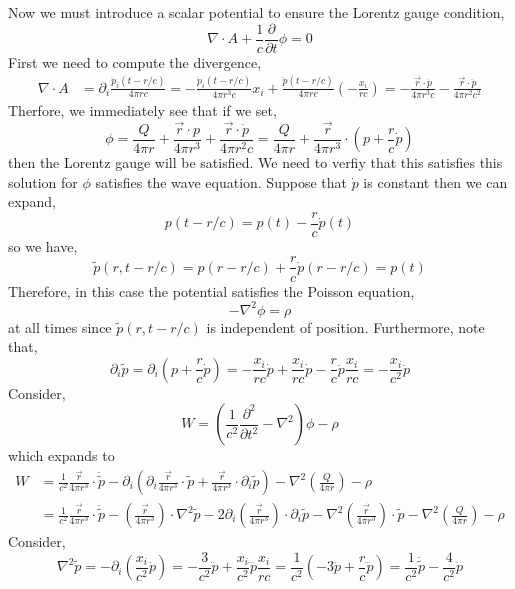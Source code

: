 \documentclass[12pt]{extarticle}
\newcommand{\pderiv}[2]{\frac{\partial{#1}}{\partial{#2}}}
\newcommand{\npar}[3]{\frac{\partial^{#1}{#2}}{\partial{#3}^{#1}}}
\theoremstyle{definition}
\begin{document}
Now we must introduce a scalar potential to ensure the Lorentz gauge condition,
\[ \nabla \cdot A + \frac{1}{c} \pderiv{}{t} \phi = 0 \]
First we need to compute the divergence,
\begin{align*}
\nabla \cdot A & = \partial_i \frac{\dot{p}_i(t - r /c)}{4 \pi r c} =  - \frac{\dot{p}_i(t - r /c)}{4 \pi r^3 c} x_i + \frac{\ddot{p}(t - r/c)}{4 \pi r c} \left( - \frac{x_i}{rc} \right) = - \frac{\vec{r} \cdot \dot{p}}{4 \pi r^3 c}  - \frac{\vec{r} \cdot \ddot{p}}{4 \pi r^2 c^2} 
\end{align*}
Therfore, we immediately see that if we set,
\[ \phi = \frac{Q}{4 \pi r} + \frac{\vec{r} \cdot p}{4\pi r^3}  + \frac{\vec{r} \cdot \dot{p}}{4 \pi r^2 c} = \frac{Q}{4 \pi r} + \frac{\vec{r}}{4 \pi r^3} \cdot \left( p + \frac{r}{c} \dot{p} \right)  \]
then the Lorentz gauge will be satisfied. We need to verfiy that this satisfies this solution for $\phi$ satisfies the wave equation. Suppose that $\dot{p}$ is constant then we can expand,
\[ p(t - r/c) = p(t) - \frac{r}{c} \dot{p}(t) \]
so we have,
\[ \tilde{p}(r, t - r/c) = p(r - r/c) + \frac{r}{c} \dot{p}(r - r/c) = p(t) \]
Therefore, in this case the potential satisfies the Poisson equation,
\[ - \nabla^2 \phi = \rho \]
at all times since $\tilde{p}(r, t - r/c)$ is independent of position. Furthermore, note that,
\[ \partial_i \tilde{p} = \partial_i \left( p + \frac{r}{c} \dot{p} \right) = - \frac{x_i}{rc} \dot{p} + \frac{x_i}{rc} \dot{p} - \frac{r}{c} \ddot{p} \frac{x_i}{rc} = - \frac{x_i}{c^2} \ddot{p} \]
Consider, 
\[ W = \left( \frac{1}{c^2} \npar{2}{}{t} - \nabla^2 \right) \phi - \rho \]
which expands to
\begin{align*}
W & = \frac{1}{c^2} \frac{\vec{r}}{4 \pi r^3} \cdot \ddot{\tilde{p}} - \partial_i \left( \partial_i \frac{\vec{r}}{4 \pi r^3} \cdot \tilde{p} + \frac{\vec{r}}{4 \pi r^3} \cdot \partial_i \tilde{p} \right) - \nabla^2 \left( \frac{Q}{4 \pi r} \right) - \rho
\\
& = \frac{1}{c^2} \frac{\vec{r}}{4 \pi r^3} \cdot \ddot{\tilde{p}} - \left( \frac{\vec{r}}{4 \pi r^3} \right) \cdot \nabla^2 \tilde{p} - 2 \partial_i \left( \frac{\vec{r}}{4 \pi r^3} \right) \cdot \partial_i \tilde{p} - \nabla^2 \left( \frac{\vec{r}}{4 \pi r^3} \right) \cdot \tilde{p} - \nabla^2 \left( \frac{Q}{4 \pi r} \right) - \rho
\end{align*}
Consider,
\[ \nabla^2 \tilde{p} = - \partial_i \left( \frac{x_i}{c^2} \ddot{p} \right) = - \frac{3}{c^2} \ddot{p} + \frac{x_i}{c^2} \dddot{p} \frac{x_i}{rc} = \frac{1}{c^2} \left( -3 \ddot{p} + \frac{r}{c} \dddot{p} \right) = \frac{1}{c^2}  \ddot{\tilde{p}} - \frac{4}{c^2} \ddot{p} \]
\end{document}
